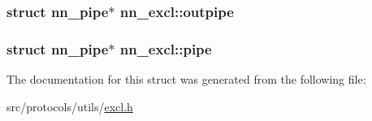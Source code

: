 \subsubsection[{outpipe}]{\setlength{\rightskip}{0pt plus 5cm}struct nn\+\_\+pipe$\ast$ nn\+\_\+excl\+::outpipe}\hypertarget{structnn__excl_a28f7fc280d63150d45dce48ff58f738d}{}\label{structnn__excl_a28f7fc280d63150d45dce48ff58f738d}
\subsubsection[{pipe}]{\setlength{\rightskip}{0pt plus 5cm}struct nn\+\_\+pipe$\ast$ nn\+\_\+excl\+::pipe}\hypertarget{structnn__excl_a94b5ea848971e08ed35baed15aea5ee9}{}\label{structnn__excl_a94b5ea848971e08ed35baed15aea5ee9}


The documentation for this struct was generated from the following file\+:\begin{DoxyCompactItemize}
\item 
src/protocols/utils/\hyperlink{excl_8h}{excl.\+h}\end{DoxyCompactItemize}

